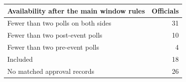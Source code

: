 \begin{tabular}{lr}
\toprule
Availability after the main window rules & Officials \\
\midrule
Fewer than two polls on both sides & 31 \\
Fewer than two post-event polls & 10 \\
Fewer than two pre-event polls &  4 \\
Included & 18 \\
No matched approval records & 26 \\
\bottomrule
\end{tabular}
